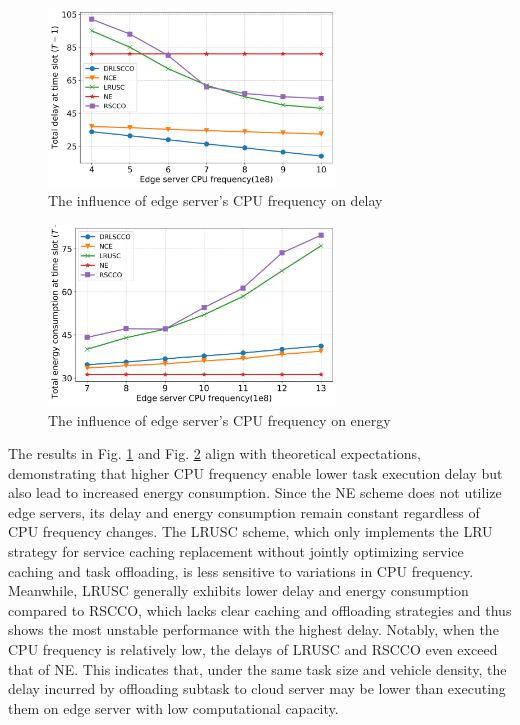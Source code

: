 \documentclass[lettersize,journal]{IEEEtran}
\begin{document}
\begin{figure}[h!]
	\centering
	\includegraphics[width=3in]{f_delay.png}
	\caption{The influence of edge server's CPU frequency on delay}
	\label{fig: f v delay}
\end{figure}
\begin{figure}[h!]
	\centering
	\includegraphics[width=3in]{f_energy.png}
	\caption{The influence of edge server's CPU frequency on energy}
	\label{fig: f v energy}
\end{figure}
The results in Fig. \ref{fig: f v delay} and Fig. \ref{fig: f v energy} align with theoretical expectations, demonstrating that higher CPU frequency enable lower task execution delay but also lead to increased  energy consumption. 
Since the NE scheme does not utilize edge servers, its delay and energy consumption remain constant regardless of CPU frequency changes.
The LRUSC scheme, which only implements the LRU strategy for service caching replacement without jointly optimizing service caching and task offloading, is less sensitive to variations in CPU frequency. 
Meanwhile, LRUSC generally exhibits lower delay and energy consumption compared to RSCCO, which lacks clear caching and offloading strategies and thus shows the most unstable performance with the highest delay.
Notably, when the CPU frequency is relatively low, the delays of LRUSC and RSCCO even exceed that of NE. This indicates that, under the same task size and vehicle density, the delay incurred by offloading subtask to cloud server may be lower than executing them on edge server with low computational capacity. 
\end{document}
